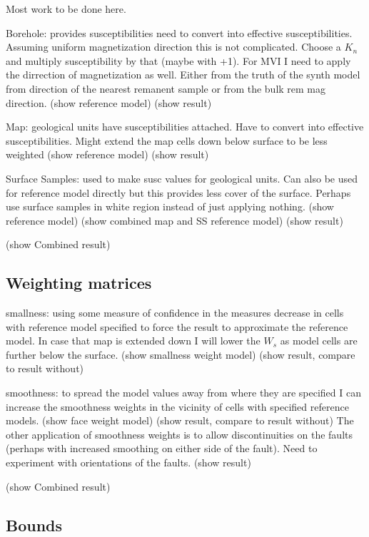 Most work to be done here. 

Borehole: provides susceptibilities need to convert into effective susceptibilities. Assuming uniform magnetization direction this is not complicated. Choose a $K_n$ and multiply susceptibility by that (maybe with +1). For MVI I need to apply the dirrection of magnetization as well. Either from the truth of the synth model from direction of the nearest remanent sample or from the bulk rem mag direction.
(show reference model)
(show result)


Map: geological units have susceptibilities attached. Have to convert into effective susceptibilities. Might extend the map cells down below surface to be less weighted
(show reference model)
(show result)

Surface Samples: used to make susc values for geological units. Can also be used for reference model directly but this provides less cover of the surface. Perhaps use surface samples in white region instead of just applying nothing.
(show reference model)
(show combined map and SS reference model)
(show result)

(show Combined result)

\subsection{Weighting matrices}
\label{sec:Weighting matrices:ElPoma1}

smallness: using some measure of confidence in the measures decrease in cells with reference model specified to force the result to approximate the reference model. In case that map is extended down I will lower the $W_s$ as model cells are further below the surface.
(show smallness weight model)
(show result, compare to result without)


smoothness: to spread the model values away from where they are specified I can increase the smoothness weights in the vicinity of cells with specified reference models. 
(show face weight model)
(show result, compare to result without)
The other application of smoothness weights is to allow discontinuities on the faults (perhaps with increased smoothing on either side of the fault). Need to experiment with orientations of the faults.
(show result)

(show Combined result)
\subsection{Bounds}
\label{sec:Bounds:ElPoma1}

